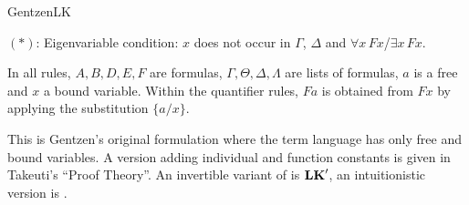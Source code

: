 \begin{entry}{GentzenLK}
\begin{calculus}
$(*)$: Eigenvariable condition: $x$ does not occur in $\Gamma$, $\Delta$ and $\forall x\, F x$/$\exists x\, F x$.

\end{calculus}


 \begin{clarifications}
   In all rules, $A,B,D,E,F$ are formulas, $\Gamma,\Theta,\Delta,\Lambda$ are lists of formulas, $a$ is a free and $x$ a bound variable. Within the quantifier rules, $F a$ is obtained from $F x$ by applying the substitution $\{ a/x \} $.

 \end{clarifications}

 \begin{history}
This is Gentzen's original formulation\cite{Gentzen1934} where the term language has only free and bound variables. A version adding individual and function constants is given in Takeuti's ``Proof Theory''\cite{Takeuti1975}. An invertible variant of \LK is $\mathbf{LK}'$, an intuitionistic version is \LJ{}. 
\end{history}


\let\LKAX\undefined
\let\LKUI\undefined
\let\LKBI\undefined
\let\LKLL\undefined
\let\LKRL\undefined
\let\LKRLN\undefined

\let\SALLL  \undefined
\let\SALLR  \undefined
\let\SEXL   \undefined
\let\SEXR   \undefined
\let\SANDL  \undefined
\let\SANDR  \undefined
\let\SORL   \undefined
\let\SORR   \undefined
\let\SIMPL  \undefined
\let\SIMPR  \undefined
\let\SNEGL  \undefined
\let\SNEGR  \undefined
\let\SWEAKL \undefined
\let\SWEAKR \undefined
\let\SCONTRL\undefined
\let\SCONTRR\undefined
\let\SEXCHL \undefined
\let\SEXCHR \undefined
\let\SCUT   \undefined
\let\SDEF   \undefined

\let\ALLL  \undefined
\let\ALLR  \undefined
\let\EXL   \undefined
\let\EXR   \undefined
\let\ANDL  \undefined
\let\ANDR  \undefined
\let\ORL   \undefined
\let\ORR   \undefined
\let\IMPL  \undefined
\let\IMPR  \undefined
\let\NEGL  \undefined
\let\NEGR  \undefined
\let\WEAKL \undefined
\let\WEAKR \undefined
\let\CONTRL\undefined
\let\CONTRR\undefined
\let\EXCHL \undefined
\let\EXCHR \undefined
\let\CUT   \undefined
\let\DEF   \undefined


\end{entry}